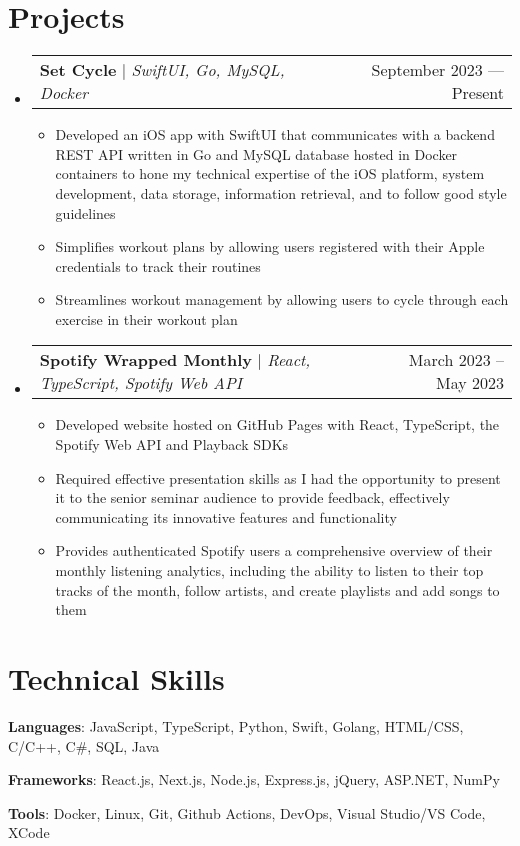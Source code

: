 \documentclass[letterpaper,11pt]{article}
\makeatletter
\newcommand{\resumeItem}[1]{
  \item\small{
	{#1 \vspace{-2pt}}
  }
}
\newcommand{\resumeProjectHeading}[2]{
	\item
	\begin{tabular*}{0.97\textwidth}{l@{\extracolsep{\fill}}r}
	  \small#1 & #2 \\
	\end{tabular*}\vspace{-7pt}
}
\newcommand{\resumeSubHeadingListStart}{\begin{itemize}[leftmargin=0.15in, label={}]}
\newcommand{\resumeSubHeadingListEnd}{\end{itemize}}
\newcommand{\resumeItemListStart}{\begin{itemize}}
\newcommand{\resumeItemListEnd}{\end{itemize}\vspace{-5pt}}
\makeatother
\begin{document}
\section{Projects}
\resumeSubHeadingListStart
\resumeProjectHeading
	{\textbf{Set Cycle} $|$ \emph{SwiftUI, Go, MySQL, Docker}}{September 2023 --- Present}
	\resumeItemListStart
		\resumeItem{Developed an iOS app with SwiftUI that communicates with a backend REST API written in Go and MySQL database hosted in Docker containers to hone my technical expertise of the iOS platform, system development, data storage, information retrieval, and to follow good style guidelines}
		\resumeItem{Simplifies workout plans by allowing users registered with their Apple credentials to track their routines}
		\resumeItem{Streamlines workout management by allowing users to cycle through each exercise in their workout plan}
	\resumeItemListEnd
\resumeProjectHeading
	{\textbf{Spotify Wrapped Monthly} $|$ \emph{React, TypeScript, Spotify Web API}}{March 2023 -- May 2023 }
	\resumeItemListStart
		\resumeItem{Developed website hosted on GitHub Pages with React, TypeScript, the Spotify Web API and Playback SDKs}
		\resumeItem{Required effective presentation skills as I had the opportunity to present it to the senior seminar audience to provide feedback, effectively communicating its innovative features and functionality}
		\resumeItem{Provides authenticated Spotify users a comprehensive overview of their monthly listening analytics, including the ability to listen to their top tracks of the month, follow artists, and create playlists and add songs to them}
	\resumeItemListEnd
\resumeSubHeadingListEnd

\section{Technical Skills}
 \begin{itemize}[leftmargin=0.15in, label={}]
	\small{
	  \item{\textbf{Languages}: JavaScript, TypeScript, Python, Swift, Golang, HTML/CSS, C/C++, C\#, SQL, Java}
	  \item{\textbf{Frameworks}: React.js, Next.js, Node.js, Express.js, jQuery, ASP.NET, NumPy}
	  \item{\textbf{Tools}: Docker, Linux, Git, Github Actions, DevOps, Visual Studio/VS Code, XCode}
	  }
 \end{itemize}

\end{document}
